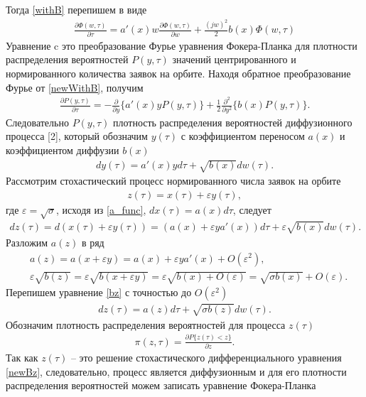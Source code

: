 Тогда \eqref{withB} перепишем в виде
\begin{align}\label{newWithB}
	\frac{\partial \Phi (w,\tau)}{\partial \tau}=a'(x) w\frac{\partial \Phi (w,\tau)}{\partial w}+\frac{(jw)^2}{2}b(x)\Phi(w,\tau)
\end{align}
Уравнение c это преобразование Фурье уравнения Фокера-Планка для плотности распределения вероятностей $P(y, \tau )$ значений центрированного и нормированного количества заявок на орбите. Находя обратное преобразование Фурье от \eqref{newWithB}, получим
\begin{align}
	\frac{\partial P (y,\tau)}{\partial \tau}=-\frac{\partial}{\partial y}\{a'(x)yP(y,\tau)\} 
	+\frac{1}{2}\frac{\partial^2}{\partial y^2}\{b(x)P(y,\tau)\}.
\end{align}
Следовательно $P (y,\tau)$ плотность распределения вероятностей диффузионного процесса [2], который обозначим $y(\tau)$ с коэффициентом переносом $a(x)$ и коэффициентом диффузии $b(x)$
\begin{align}
	dy(\tau)=a'(x)yd\tau+\sqrt{b(x)}dw(\tau).
\end{align}
Рассмотрим стохастический процесс нормированного числа заявок на орбите
\begin{align}
	z(\tau)=x(\tau)+\varepsilon y(\tau),
\end{align}
где $\varepsilon=\sqrt{\sigma}$, исходя из  \eqref{a_func}, $dx(\tau)=a(x)d\tau$, следует
\begin{align}\label{bz}
	dz(\tau)=d(x(\tau)+\varepsilon y(\tau))=(a(x)+\varepsilon ya'(x))d\tau+\varepsilon \sqrt{b(x)}dw(\tau).
\end{align}
Разложим $a(z)$ в ряд 
\begin{align*}
	&a(z)=a(x+\varepsilon y)=a(x)+\varepsilon y a'(x)+O(\varepsilon^2),\\
	&\varepsilon\sqrt{b(z)}=\varepsilon\sqrt{b(x+\varepsilon y)}=\varepsilon\sqrt{b(x)+O(\varepsilon)}=\sqrt{\sigma b(x)}+O(\varepsilon).
\end{align*}
Перепишем уравнение \eqref{bz} с точностью до $O(\varepsilon^2)$
\begin{align}\label{newBz}
	dz(\tau)=a(z)d\tau+\sqrt{\sigma b(z)}dw(\tau).
\end{align}
Обозначим плотность распределения вероятностей для процесса $z(\tau)$
\begin{align*}
	\pi(z,\tau)=\frac{\partial P\{z(\tau)<z\}}{\partial z}.
\end{align*}
Так как $z(\tau)$ -- это решение стохастического дифференциального уравнения \eqref{newBz}, следовательно, процесс является диффузионным и для его плотности распределения вероятностей можем записать уравнение Фокера-Планка
